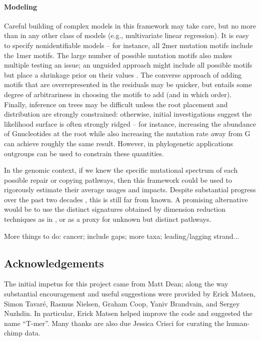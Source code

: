 \documentclass{article}
\newcommand{\nG}{\mbox{G}}
\theoremstyle{plain}
\theoremstyle{definition}
\begin{document}
\paragraph{Modeling}
Careful building of complex models in this framework may take care,
but no more than in any other class of models (e.g., multivariate linear regression).
It is easy to specify nonidentifiable models --
for instance, all 2mer mutation motifs include the 1mer motifs.
The large number of possible mutation motifs also makes multiple testing an issue;
an unguided approach might include all possible motifs but place a shrinkage prior on their values \citep{bhadra2015horseshoe}.
The converse approach of adding motifs that are overrepresented in the residuals
may be quicker, but entails some degree of arbitrariness in choosing the motifs to add (and in which order).
Finally, inference on trees may be difficult unless the root placement and distribution are strongly constrained:
otherwise, initial investigations suggest the likelihood surface is often strongly ridged --
for instance, increasing the abundance of \nG nucleotides at the root while also increasing the mutation rate away from \nG
can achieve roughly the same result.
However, in phylogenetic applications outgroups can be used to constrain these quantities.

In the genomic context,
if we knew the specific mutational spectrum of each possible repair or copying pathways,
then this framework could be used to rigorously estimate their average usages and impacts.
Despite substantial progress over the past two decades \citep{goodman2013translesion,sale2012yfamily},
this is still far from known.
A promising alternative would be to use the distinct signatures obtained by dimension reduction techniques as in
\citet{alexandrov2013signatures}, \citep{mathieson2017differences} or \citep{shiraishi2015simple} as a proxy for unknown but distinct pathways.

More things to do: cancer; include gaps; more taxa; leading/lagging strand...


\subsection{Acknowledgements}
The initial impetus for this project came from Matt Dean;
along the way substantial encouragement and useful suggestions were provided by
Erick Matsen, Simon Tavar\'e, Rasmus Nielsen, Graham Coop, Yaniv Brandvain, and Sergey Nuzhdin.
In particular, Erick Matsen helped improve the code and suggested the name ``T-mer''.
Many thanks are also due Jessica Crisci for curating the human-chimp data.
\end{document}
